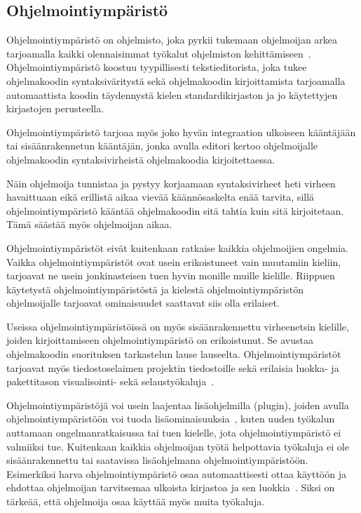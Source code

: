 \documentclass[finnish]{tktltiki2}
\theoremstyle{definition}
\theoremstyle{remark}
\begin{document}
\subsection{Ohjelmointiympäristö}
Ohjelmointiympäristö on ohjelmisto, joka pyrkii tukemaan ohjelmoijan arkea tarjoamalla kaikki olennaisimmat työkalut ohjelmiston kehittämiseen~\cite{eclipse-ide}. Ohjelmointiympäristö koostuu tyypillisesti tekstieditorista, joka tukee ohjelmakoodin syntaksiväritystä sekä ohjelmakoodin kirjoittamista tarjoamalla automaattista koodin täydennystä kielen standardikirjaston ja jo käytettyjen kirjastojen perusteella.

Ohjelmointiympäristö tarjoaa myös joko hyvän integraation ulkoiseen kääntäjään tai sisäänrakennetun kääntäjän, jonka avulla editori kertoo ohjelmoijalle ohjelmakoodin syntaksivirheistä ohjelmakoodia kirjoitettaessa.

Näin ohjelmoija tunnistaa ja pystyy korjaamaan syntaksivirheet heti virheen havaittuaan eikä erillistä aikaa vievää käännösaskelta enää tarvita, sillä ohjelmointiympäristö kääntää ohjelmakoodin sitä tahtia kuin sitä kirjoitetaan. Tämä säästää myös ohjelmoijan aikaa.

Ohjelmointiympäristöt eivät kuitenkaan ratkaise kaikkia ohjelmoijien ongelmia. Vaikka ohjelmointiympäristöt ovat usein erikoistuneet vain muutamiin kieliin, tarjoavat ne usein jonkinasteisen tuen hyvin monille muille kielille. Riippuen käytetystä ohjelmointiympäristöstä ja kielestä ohjelmointiympäristön ohjelmoijalle tarjoavat ominaisuudet saattavat siis olla erilaiset.

Useissa ohjelmointiympäristöissä on myös sisäänrakennettu virheenetsin kielille, joiden kirjoittamiseen ohjelmointiympäristö on erikoistunut. Se avustaa ohjelmakoodin suorituksen tarkastelun lause lauseelta. Ohjelmointiympäristöt tarjoavat myös tiedostoselaimen projektin tiedostoille sekä erilaisia luokka- ja pakettitason visualisointi- sekä selaustyökaluja~\cite{eclipse-ide}.

Ohjelmointiympäristöjä voi usein laajentaa lisäohjelmilla (plugin), joiden avulla ohjelmointiympäristöön voi tuoda lisäominaisuuksia~\cite{eclipse-ide}, kuten uuden työkalun auttamaan ongelmanratkaisussa tai tuen kielelle, jota ohjelmointiympäristö ei valmiiksi tue. Kuitenkaan kaikkia ohjelmoijan työtä helpottavia työkaluja ei ole sisäänrakennettu tai saatavissa lisäohjelmana ohjelmointiympäristöön. Esimerkiksi harva ohjelmointiympäristö osaa automaattisesti ottaa käyttöön ja ehdottaa ohjelmoijan tarvitsemaa ulkoista kirjastoa ja sen luokkia~\cite{jungloid-mining}. Siksi on tärkeää, että ohjelmoija osaa käyttää myös muita työkaluja.
\end{document}
